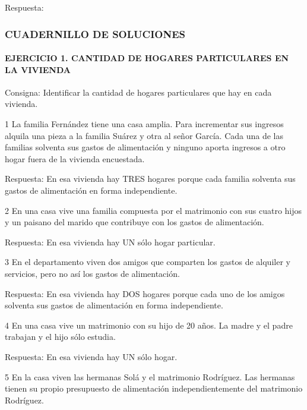 \documentclass[
  openany]{book}
\begin{document}
Respuesta:

\hypertarget{cuadernillo-de-soluciones}{%
\subsubsection{\texorpdfstring{\textbf{CUADERNILLO DE SOLUCIONES}}{CUADERNILLO DE SOLUCIONES}}\label{cuadernillo-de-soluciones}}

\hypertarget{ejercicio-1.-cantidad-de-hogares-particulares-en-la-vivienda-1}{%
\paragraph{\texorpdfstring{\textbf{EJERCICIO 1. CANTIDAD DE HOGARES PARTICULARES EN LA VIVIENDA}}{EJERCICIO 1. CANTIDAD DE HOGARES PARTICULARES EN LA VIVIENDA}}\label{ejercicio-1.-cantidad-de-hogares-particulares-en-la-vivienda-1}}

Consigna: Identificar la cantidad de hogares particulares que hay en cada vivienda.

1 La familia Fernández tiene una casa amplia. Para incrementar sus ingresos alquila una pieza a la familia Suárez y otra al señor García. Cada una de las familias solventa sus gastos de alimentación y ninguno aporta ingresos a otro hogar fuera de la vivienda encuestada.

Respuesta: En esa vivienda hay TRES hogares porque cada familia solventa sus gastos de alimentación en forma independiente.

2 En una casa vive una familia compuesta por el matrimonio con sus cuatro hijos y un paisano del marido que contribuye con los gastos de alimentación.

Respuesta: En esa vivienda hay UN sólo hogar particular.

3 En el departamento viven dos amigos que comparten los gastos de alquiler y servicios, pero no así los gastos de alimentación.

Respuesta: En esa vivienda hay DOS hogares porque cada uno de los amigos solventa sus gastos de alimentación en forma independiente.

4 En una casa vive un matrimonio con su hijo de 20 años. La madre y el padre trabajan y el hijo sólo estudia.

Respuesta: En esa vivienda hay UN sólo hogar.

5 En la casa viven las hermanas Solá y el matrimonio Rodríguez. Las hermanas tienen su propio presupuesto de alimentación independientemente del matrimonio Rodríguez.
\end{document}
